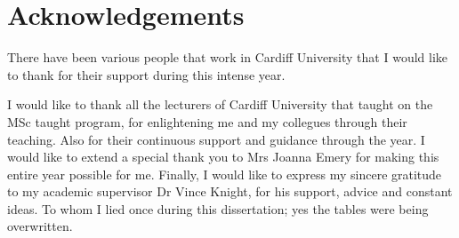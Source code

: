 \chapter{Acknowledgements}
There have been various people that work in Cardiff University that I would
like to thank for their support during this intense year.


I would like to thank all the lecturers of Cardiff University that taught on
the MSc taught program, for enlightening me and my collegues through their teaching.
Also for their continuous support and guidance through the year.
I would like to extend a special thank you to Mrs Joanna Emery for making this
entire year possible for me. Finally, I would like to express my sincere gratitude
to my academic supervisor Dr Vince Knight, for his support, advice and constant
ideas. To whom I lied once during this dissertation; yes the tables were being
overwritten.
